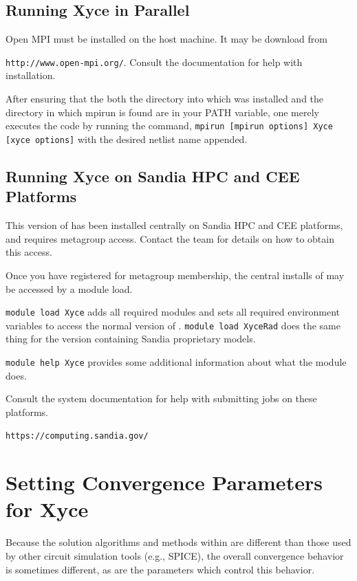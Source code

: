 \section{Running Xyce in Parallel}

Open MPI must be installed on the host machine.  It may be download from 

\texttt{http://www.open-mpi.org/}.  Consult the documentation for help with installation.

After ensuring that the both the directory into which \Xyce{} was
installed and the directory in which mpirun is found are in your PATH
variable, one merely executes the code by running the command,
\texttt{mpirun [mpirun options] Xyce [xyce options]} with the desired
netlist name appended.

\section{Running Xyce on Sandia HPC and CEE Platforms}



This version of \Xyce{} has been installed centrally on Sandia HPC
and CEE platforms, and requires metagroup access.  Contact the \Xyce{} team
for details on how to obtain this access.

Once you have registered for metagroup membership, the central
installs of \Xyce{} may be accessed by a module load.

\verb+module load Xyce+ adds all required modules and sets all
required environment variables to access the normal version of
\Xyce{}.  \verb+module load XyceRad+ does the same thing for the
version \Xyce{} containing Sandia proprietary models.

\verb+module help Xyce+ provides some additional information about
what the module does.

Consult the system documentation for help with submitting jobs on
these platforms.

\verb+https://computing.sandia.gov/+

\cleardoublepage

\chapter{Setting Convergence Parameters for Xyce}
\label{Conv_Guidelines}

Because the solution algorithms and methods within \Xyce{} are different than
those used by other circuit simulation tools (e.g., SPICE), the overall
convergence behavior is sometimes different, as are the parameters which control
this behavior.

